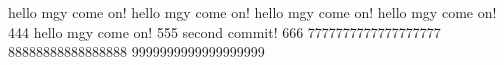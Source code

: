 hello mgy  come on!
hello mgy  come on!
hello mgy  come on!
hello mgy  come on! 444
hello mgy  come on! 555
second commit!  666
7777777777777777777
88888888888888888
9999999999999999999
